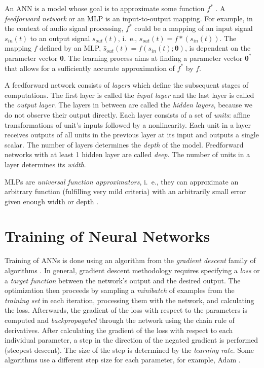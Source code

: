 An \ac{ANN} is a model whose goal is to approximate some function $f^*$ \cite{Goodfellow-et-al-2016}. A \emph{feedforward network} or an \ac{MLP} is an input-to-output mapping. For example, in the context of audio signal processing, $f^*$ could be a mapping of an input signal $s_{in}(t)$ to an output signal $s_{out}(t)$, i.\ e., $s_{out}(t) = f*(s_{in}(t))$. The mapping $f$ defined by an \ac{MLP}, $\hat{s}_{out}(t) = f(s_{in}(t); \pmb{\theta})$, is dependent on the parameter vector $\pmb{\theta}$. The learning process aims at finding a parameter vector $\pmb{\theta^*}$ that allows for a sufficiently accurate approximation of $f^*$ by $f$.


A feedforward network consists of \emph{layers} which define the subsequent stages of computations. The first layer is called the \emph{input layer} and the last layer is called the \emph{output layer}. The layers in between are called the \emph{hidden layers}, because we do not observe their output directly. Each layer consists of a set of \emph{units}: affine transformations of unit's inputs followed by a nonlinearity. Each unit in a layer receives outputs of all units in the previous layer at its input and outputs a single scalar. The number of layers determines the \emph{depth} of the model. Feedforward networks with at least 1 hidden layer are called \emph{deep}. The number of units in a layer determines its \emph{width}.

\acp{MLP} are \emph{universal function approximators}, i.\ e., they can approximate an arbitrary function (fulfilling very mild criteria) with an arbitrarily small error given enough width or depth \cite{Goodfellow-et-al-2016}.

\section*{Training of Neural Networks}

Training of \acp{ANN} is done using an algorithm from the \emph{gradient descent} family of algorithms \cite{Goodfellow-et-al-2016}. In general, gradient descent methodology requires specifying a \emph{loss} or a \emph{target function} between the network's output and the desired output. The optimization then proceeds by sampling a \emph{minibatch} of examples from the \emph{training set} in each iteration, processing them with the network, and calculating the loss. Afterwards, the gradient of the loss with respect to the parameters is computed and \emph{backpropagated} through the network using the chain rule of derivatives. After calculating the gradient of the loss with respect to each individual parameter, a step in the direction of the negated gradient is performed (steepest descent). The size of the step is determined by the \emph{learning rate}. Some algorithms use a different step size for each parameter, for example, Adam \cite{Kingma2017}.

